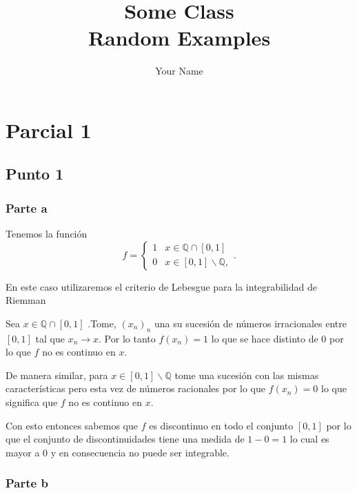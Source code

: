 \documentclass{report}
\title{\Huge{Some Class}\\Random Examples}
\author{\huge{Your Name}}
\date{}
\newcommand{\Q}{\mathbb{Q}}
\begin{document}
\maketitle
\newpage%
\tableofcontents
\pagebreak

\chapter{Parcial 1}
\section{Punto 1}
\subsection{Parte a}

Tenemos la función \[
f = 
\begin{cases}
  1 & x \in \mathbb{Q}\cap\left[ 0, 1 \right] \\
  0 & x \in \left[ 0, 1 \right] \backslash \Q,
\end{cases}
.\] 

En este caso utilizaremos el criterio de Lebesgue para la integrabilidad de Riemman

Sea $x \in \Q\cap\left[ 0, 1 \right] $ .Tome, $\left( x_n \right)_{n}$ una su sucesión de números irracionales entre $\left[ 0, 1 \right] $ tal que $x_n \to x$. Por lo tanto $f\left( x_n \right) = 1$ lo que se hace distinto de $0$ por lo que $f$ no es continuo en $x$.

De manera similar, para $x \in \left[ 0, 1 \right] \backslash \mathbb{Q}$ tome una sucesión con las mismas características pero esta vez de números racionales por lo que $f\left( x_n \right) = 0$ lo que significa que $f$ no es continuo en $x$.

Con esto entonces sabemos que $f$ es discontinuo en todo el conjunto $\left[ 0, 1 \right] $ por lo que el conjunto de discontinuidades tiene una medida de $ 1 - 0 = 1$ lo cual es mayor a $0$ y en consecuencia no puede ser integrable.
\subsection{Parte b}
\end{document}
